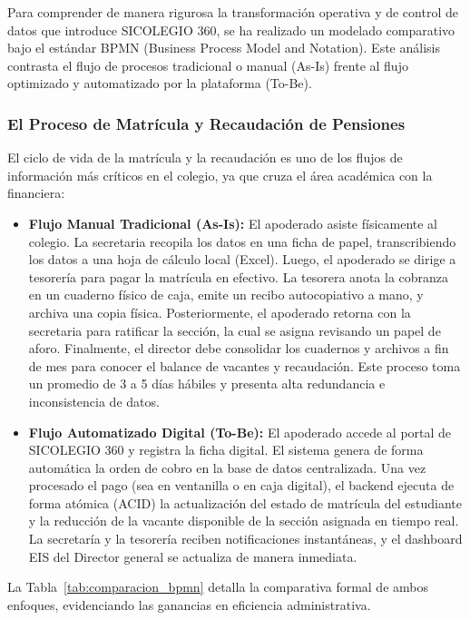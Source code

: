 \documentclass[12pt,a4paper,oneside]{report}
\begin{document}
Para comprender de manera rigurosa la transformación operativa y de control de datos que introduce SICOLEGIO 360, se ha realizado un modelado comparativo bajo el estándar BPMN (Business Process Model and Notation). Este análisis contrasta el flujo de procesos tradicional o manual (As-Is) frente al flujo optimizado y automatizado por la plataforma (To-Be).

\subsubsection{El Proceso de Matrícula y Recaudación de Pensiones}
El ciclo de vida de la matrícula y la recaudación es uno de los flujos de información más críticos en el colegio, ya que cruza el área académica con la financiera:

\begin{itemize}
    \item \textbf{Flujo Manual Tradicional (As-Is):} El apoderado asiste físicamente al colegio. La secretaria recopila los datos en una ficha de papel, transcribiendo los datos a una hoja de cálculo local (Excel). Luego, el apoderado se dirige a tesorería para pagar la matrícula en efectivo. La tesorera anota la cobranza en un cuaderno físico de caja, emite un recibo autocopiativo a mano, y archiva una copia física. Posteriormente, el apoderado retorna con la secretaria para ratificar la sección, la cual se asigna revisando un papel de aforo. Finalmente, el director debe consolidar los cuadernos y archivos a fin de mes para conocer el balance de vacantes y recaudación. Este proceso toma un promedio de 3 a 5 días hábiles y presenta alta redundancia e inconsistencia de datos.
    \item \textbf{Flujo Automatizado Digital (To-Be):} El apoderado accede al portal de SICOLEGIO 360 y registra la ficha digital. El sistema genera de forma automática la orden de cobro en la base de datos centralizada. Una vez procesado el pago (sea en ventanilla o en caja digital), el backend ejecuta de forma atómica (ACID) la actualización del estado de matrícula del estudiante y la reducción de la vacante disponible de la sección asignada en tiempo real. La secretaría y la tesorería reciben notificaciones instantáneas, y el dashboard EIS del Director general se actualiza de manera inmediata.
\end{itemize}

La Tabla~\ref{tab:comparacion_bpmn} detalla la comparativa formal de ambos enfoques, evidenciando las ganancias en eficiencia administrativa.
\end{document}
